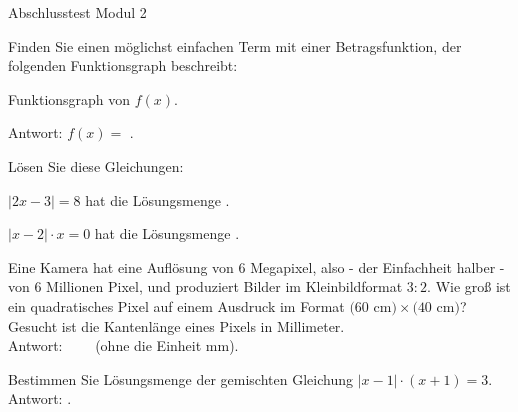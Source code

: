 
\begin{MTest}{Abschlusstest Modul 2}

\begin{MExercise}
Finden Sie einen möglichst einfachen Term mit einer Betragsfunktion, der folgenden Funktionsgraph beschreibt:
\begin{center}
\par
Funktionsgraph von $f(x)$.
\end{center}

Antwort: $f(x)=$ \: .
\end{MExercise}

\begin{MExercise}
Lösen Sie diese Gleichungen:
\begin{MExerciseItems}
\item{$|2x-3|=8$ hat die Lösungsmenge .}
\item{$|x-2|\cdot x=0$ hat die Lösungsmenge  .} 
\end{MExerciseItems}
\end{MExercise}

\begin{MExercise}
Eine Kamera hat eine Auflösung von $6$ Megapixel, also - der Einfachheit halber - von 6 Millionen Pixel, und produziert Bilder im Kleinbildformat $3:2$.
Wie groß ist ein quadratisches Pixel auf einem Ausdruck im Format $(60$ cm$) \times (40$ cm$)$? Gesucht ist die Kantenlänge eines Pixels in Millimeter.
\ \\
Antwort: \ \ \ \ (ohne die Einheit mm).
\end{MExercise}

\begin{MExercise}
Bestimmen Sie Lösungsmenge der gemischten Gleichung $|x-1|\cdot (x+1)=3$.\\
Antwort: .
\end{MExercise}


\end{MTest}


\newpage
\MPrintIndex


